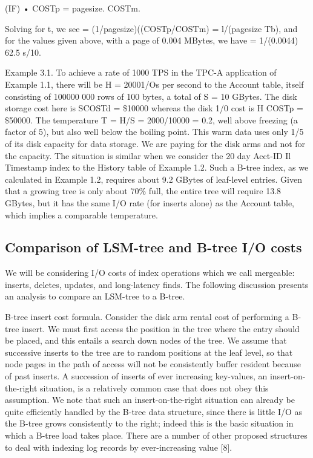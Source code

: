 \documentclass[a4paper,11pt,notitlepage,twoside,openright]{article}
\begin{document}
(IF) • COSTp = pagesize. COSTm.

Solving for t, we see = (1/pagesize)((COSTp/COSTm) = l/(pagesize Tb),
and for the values given above, with a page of 0.004 MBytes, we have =
1/(0.0044) 62.5 s/10.

Example 3.1. To achieve a rate of 1000 TPS in the TPC-A application of
Example 1.1, there will be H = 20001/Os per second to the Account table,
itself consisting of 100000 000 rows of 100 bytes, a total of S = 10
GBytes. The disk storage cost here is SCOSTd = \$10000 whereas the disk
1/0 cost is H COSTp = \$50000. The temperature T = H/S = 2000/10000 =
0.2, well above freezing (a factor of 5), but also well below the
boiling point. This warm data uses only 1/5 of its disk capacity for
data storage. We are paying for the disk arms and not for the capacity.
The situation is similar when we consider the 20 day Acct-ID Il
Timestamp index to the History table of Example 1.2. Such a B-tree
index, as we calculated in Example 1.2, requires about 9.2 GBytes of
leaf-level entries. Given that a growing tree is only about 70\% full,
the entire tree will require 13.8 GBytes, but it has the same I/O rate
(for inserts alone) as the Account table, which implies a comparable
temperature.


\hypertarget{comparison-of-lsm-tree-and-b-tree-io-costs}{%
\subsection{Comparison of LSM-tree and B-tree I/O
costs}\label{comparison-of-lsm-tree-and-b-tree-io-costs}}


We will be considering I/O costs of index operations which we call
mergeable: inserts, deletes, updates, and long-latency finds. The
following discussion presents an analysis to compare an LSM-tree to a
B-tree.

B-tree insert cost formula. Consider the disk arm rental cost of
performing a B-tree insert. We must first access the position in the
tree where the entry should be placed, and this entails a search down
nodes of the tree. We assume that successive inserts to the tree are to
random positions at the leaf level, so that node pages in the path of
access will not be consistently buffer resident because of past inserts.
A succession of inserts of ever increasing key-values, an
insert-on-the-right situation, is a relatively common case that does not
obey this assumption. We note that such an insert-on-the-right situation
can already be quite efficiently handled by the B-tree data structure,
since there is little I/O as the B-tree grows consistently to the right;
indeed this is the basic situation in which a B-tree load takes place.
There are a number of other proposed structures to deal with indexing
log records by ever-increasing value {[}8{]}.
\end{document}
